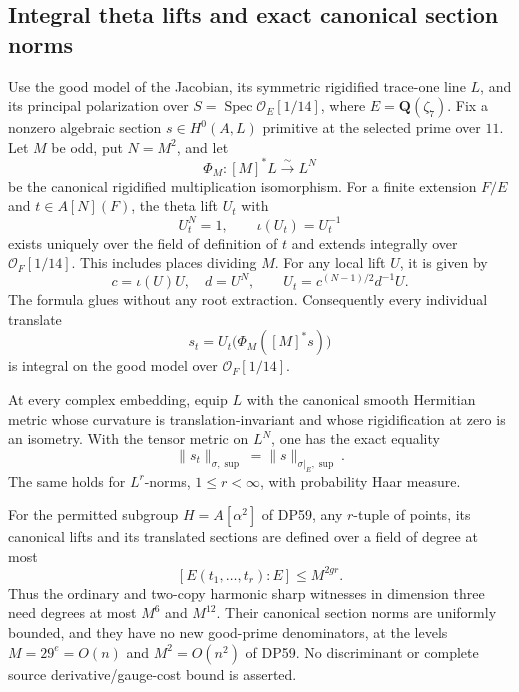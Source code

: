 \subsection{Integral theta lifts and exact canonical section norms}

\begin{theorem}\label{DP62}
Use the good model of the Jacobian, its symmetric rigidified trace-one line $L$, and its principal polarization over
$S=\operatorname{Spec}\mathcal O_E[1/14]$, where $E=\mathbf Q(\zeta_7)$.
Fix a nonzero algebraic section $s\in H^0(A,L)$ primitive at the selected prime over $11$.
Let $M$ be odd, put $N=M^2$, and let
\[
 \Phi_M:[M]^*L\xrightarrow{\sim}L^N
\]
be the canonical rigidified multiplication isomorphism.
For a finite extension $F/E$ and $t\in A[N](F)$, the theta lift $U_t$ with
\[
 U_t^N=1,\qquad \iota(U_t)=U_t^{-1}
\]
exists uniquely over the field of definition of $t$ and extends integrally over $\mathcal O_F[1/14]$.
This includes places dividing $M$.
For any local lift $U$, it is given by
\begin{equation}\label{eq:rootfreethetalift}
 c=\iota(U)U,\quad d=U^N,\qquad
 U_t=c^{(N-1)/2}d^{-1}U.
\end{equation}
The formula glues without any root extraction.
Consequently every individual translate
\[
 s_t=U_t\bigl(\Phi_M([M]^*s)\bigr)
\]
is integral on the good model over $\mathcal O_F[1/14]$.

At every complex embedding, equip $L$ with the canonical smooth Hermitian metric whose curvature is translation-invariant and whose rigidification at zero is an isometry.
With the tensor metric on $L^N$, one has the exact equality
\begin{equation}\label{eq:individualthetanorm}
 \|s_t\|_{\sigma,\sup}
 =\|s\|_{\sigma|_E,\sup}.
\end{equation}
The same holds for $L^r$-norms, $1\le r<\infty$, with probability Haar measure.

For the permitted subgroup $H=A[\alpha^2]$ of DP59, any $r$-tuple of points, its canonical lifts and its translated sections are defined over a field of degree at most
\[
 [E(t_1,\ldots,t_r):E]\le M^{2gr}.
\]
Thus the ordinary and two-copy harmonic sharp witnesses in dimension three need degrees at most $M^6$ and $M^{12}$.
Their canonical section norms are uniformly bounded, and they have no new good-prime denominators, at the levels $M=29^e=O(n)$ and $M^2=O(n^2)$ of DP59.
No discriminant or complete source derivative/gauge-cost bound is asserted.
\end{theorem}

